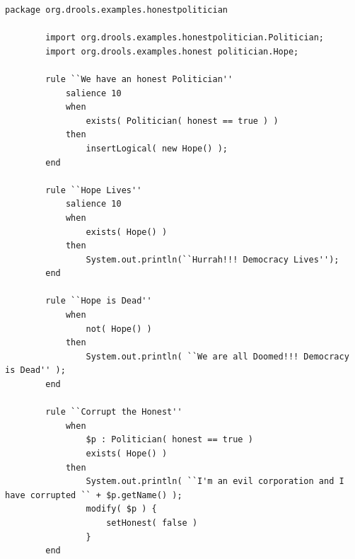 \noindent\begin{minipage}{\textwidth}
    \begin{lstlisting}[language={[drl]Drools}, caption=Example Drools file., captionpos=b, label=listing:drl_file]
        package org.drools.examples.honestpolitician
    
        import org.drools.examples.honestpolitician.Politician;
        import org.drools.examples.honest politician.Hope;
        
        rule ``We have an honest Politician''
            salience 10
            when
                exists( Politician( honest == true ) )
            then
                insertLogical( new Hope() );
        end
        
        rule ``Hope Lives''
            salience 10
            when
                exists( Hope() )
            then
                System.out.println(``Hurrah!!! Democracy Lives'');
        end
        
        rule ``Hope is Dead''
            when
                not( Hope() )
            then
                System.out.println( ``We are all Doomed!!! Democracy is Dead'' );
        end
        
        rule ``Corrupt the Honest''
            when
                $p : Politician( honest == true )   
                exists( Hope() )
            then
                System.out.println( ``I'm an evil corporation and I have corrupted `` + $p.getName() );
                modify( $p ) { 
                    setHonest( false ) 
                }
        end
    \end{lstlisting}
\end{minipage}

